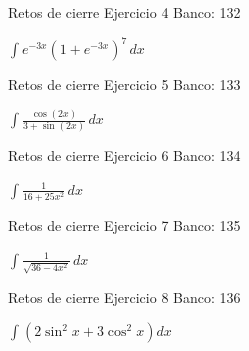 \documentclass[aspectratio=169,12pt]{beamer}
\newcommand{\ejercicio}[1]{%
  \begin{center}
  \vfill
  {\fontsize{24}{30}\selectfont #1}
  \vfill
  \end{center}
}
\begin{document}
\begin{frame}{Retos de cierre}
\small Ejercicio 4 \hfill Banco: 132
\ejercicio{$\displaystyle \int e^{-3x}(1+e^{-3x})^7\,dx$}
\end{frame}

\begin{frame}{Retos de cierre}
\small Ejercicio 5 \hfill Banco: 133
\ejercicio{$\displaystyle \int\frac{\cos(2x)}{3+\sin(2x)}\,dx$}
\end{frame}

\begin{frame}{Retos de cierre}
\small Ejercicio 6 \hfill Banco: 134
\ejercicio{$\displaystyle \int\frac{1}{16+25x^2}\,dx$}
\end{frame}

\begin{frame}{Retos de cierre}
\small Ejercicio 7 \hfill Banco: 135
\ejercicio{$\displaystyle \int\frac{1}{\sqrt{36-4x^2}}\,dx$}
\end{frame}

\begin{frame}{Retos de cierre}
\small Ejercicio 8 \hfill Banco: 136
\ejercicio{$\displaystyle \int\left(2\sin^2x+3\cos^2x\right)dx$}
\end{frame}
\end{document}
